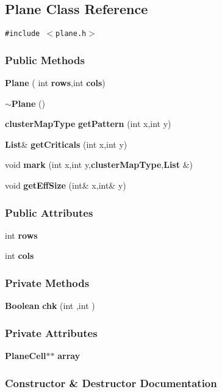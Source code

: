 \subsection{Plane  Class Reference}
\label{Plane}
{\tt \#include $<$plane.h$>$}

\subsubsection*{Public Methods}
\begin{CompactItemize}
\item 
{\bf Plane} ( int {\bf rows},int {\bf cols})
\item 
{\bf $\sim$Plane} ()
\item 
{\bf cluster\-Map\-Type} {\bf get\-Pattern} (int x,int y)
\item 
{\bf List}\& {\bf get\-Criticals} (int x,int y)
\item 
void {\bf mark} (int x,int y,{\bf cluster\-Map\-Type},{\bf List} \&)
\item 
void {\bf get\-Eff\-Size} (int\& x,int\& y)
\end{CompactItemize}
\subsubsection*{Public Attributes}
\begin{CompactItemize}
\item 
int {\bf rows}
\item 
int {\bf cols}
\end{CompactItemize}
\subsubsection*{Private Methods}
\begin{CompactItemize}
\item 
{\bf Boolean} {\bf chk} (int ,int )
\end{CompactItemize}
\subsubsection*{Private Attributes}
\begin{CompactItemize}
\item 
{\bf Plane\-Cell}$\ast$$\ast$ {\bf array}
\end{CompactItemize}


\subsubsection{Constructor \& Destructor Documentation}
\label{Plane_a0}
